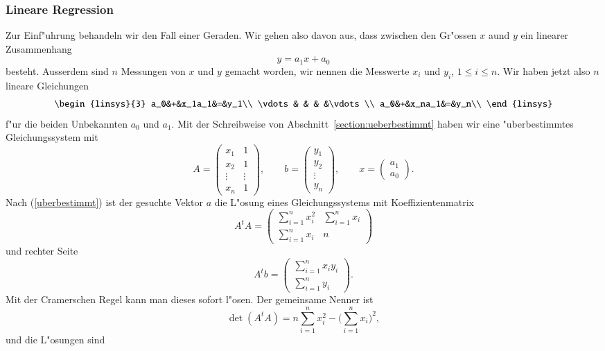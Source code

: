 \subsubsection{Lineare Regression}
Zur Einf"uhrung behandeln wir den Fall einer Geraden. Wir gehen also
davon aus, dass zwischen den Gr"ossen $x$ aund $y$ ein linearer
Zusammenhang
\[
y=a_1x+a_0
\]
besteht. Ausserdem sind $n$ Messungen von $x$ und $y$ gemacht worden,
wir nennen die Messwerte $x_i$ und $y_i$, $1\le i\le n$. Wir haben 
jetzt also $n$ lineare Gleichungen
\[
\begin{linsys}{3}
a_0&+&x_1a_1&=&y_1\\
\vdots& &   & &\vdots\\
a_0&+&x_na_1&=&y_n\\
\end{linsys}
\]
f"ur die beiden Unbekannten $a_0$ und $a_1$.
Mit der Schreibweise von Abschnitt~\ref{section:ueberbestimmt} haben wir eine
"uberbestimmtes Gleichungssystem mit
\[
A=\begin{pmatrix}
x_1&1\\
x_2&1\\
\vdots&\vdots\\
x_n&1
\end{pmatrix},\qquad
b=\begin{pmatrix}
y_1\\y_2\\\vdots\\y_n
\end{pmatrix},\qquad
x=\begin{pmatrix}
a_1\\a_0
\end{pmatrix}.
\]
Nach (\ref{uberbestimmt}) ist der gesuchte Vektor $a$ die L"osung
eines Gleichungssystems mit Koeffizientenmatrix
\[
A^tA=\begin{pmatrix}
\sum_{i=1}^nx_i^2&\sum_{i=1}^nx_i\\
\sum_{i=1}^nx_i&n
\end{pmatrix}
\]
und rechter Seite
\[
A^tb=\begin{pmatrix}
\sum_{i=1}^nx_iy_i\\
\sum_{i=1}^ny_i
\end{pmatrix}.
\]
Mit der Cramerschen Regel kann man dieses sofort l"osen. Der gemeinsame
Nenner ist 
\[
\det(A^tA)=n\sum_{i=1}^nx_i^2-\biggl(\sum_{i=1}^nx_i\biggr)^2,
\]
und die L"osungen sind
